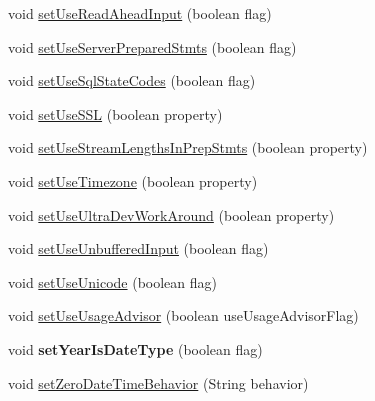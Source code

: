 \begin{DoxyCompactItemize}
\item 
void \mbox{\hyperlink{classcom_1_1mysql_1_1jdbc_1_1_connection_properties_impl_a8abdec8506338f240bf554813798915d}{set\+Use\+Read\+Ahead\+Input}} (boolean flag)
\item 
void \mbox{\hyperlink{classcom_1_1mysql_1_1jdbc_1_1_connection_properties_impl_a0660fbe7acc74e4c2aa96f138956694c}{set\+Use\+Server\+Prepared\+Stmts}} (boolean flag)
\item 
void \mbox{\hyperlink{classcom_1_1mysql_1_1jdbc_1_1_connection_properties_impl_a8eabf77ac309ee2e5a22123aed0d9753}{set\+Use\+Sql\+State\+Codes}} (boolean flag)
\item 
void \mbox{\hyperlink{classcom_1_1mysql_1_1jdbc_1_1_connection_properties_impl_aba2cc91a3bc602fe6cdf445d9c9c5166}{set\+Use\+S\+SL}} (boolean property)
\item 
void \mbox{\hyperlink{classcom_1_1mysql_1_1jdbc_1_1_connection_properties_impl_a74753aa2e027512442d0b3bbae3a2ed2}{set\+Use\+Stream\+Lengths\+In\+Prep\+Stmts}} (boolean property)
\item 
void \mbox{\hyperlink{classcom_1_1mysql_1_1jdbc_1_1_connection_properties_impl_ad035c0773944baefb17d901bc0915c81}{set\+Use\+Timezone}} (boolean property)
\item 
void \mbox{\hyperlink{classcom_1_1mysql_1_1jdbc_1_1_connection_properties_impl_acfd325b2c44c9e5ff9b6befde38fe659}{set\+Use\+Ultra\+Dev\+Work\+Around}} (boolean property)
\item 
void \mbox{\hyperlink{classcom_1_1mysql_1_1jdbc_1_1_connection_properties_impl_a8b5296b57383965f755f0d435a2868a0}{set\+Use\+Unbuffered\+Input}} (boolean flag)
\item 
void \mbox{\hyperlink{classcom_1_1mysql_1_1jdbc_1_1_connection_properties_impl_a67fda6c70d561a763aa0dd961a5b4dc1}{set\+Use\+Unicode}} (boolean flag)
\item 
void \mbox{\hyperlink{classcom_1_1mysql_1_1jdbc_1_1_connection_properties_impl_a4140fb151ca7b1288971b1ce6a1dc437}{set\+Use\+Usage\+Advisor}} (boolean use\+Usage\+Advisor\+Flag)
\item 
\mbox{\label{classcom_1_1mysql_1_1jdbc_1_1_connection_properties_impl_aa24932bd6505d49eba6e3c2f83d9c542}} 
void {\bfseries set\+Year\+Is\+Date\+Type} (boolean flag)
\item 
void \mbox{\hyperlink{classcom_1_1mysql_1_1jdbc_1_1_connection_properties_impl_a33ad0a39d9fcf2e41a074d50cfe7c226}{set\+Zero\+Date\+Time\+Behavior}} (String behavior)

\end{DoxyCompactItemize}
